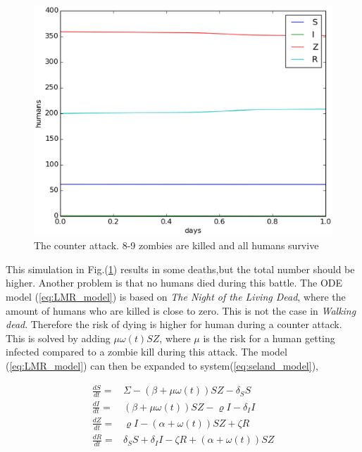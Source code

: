 \documentclass[%
twoside,                 %
final,                   %
10pt]{article}
\begin{document}
\begin{figure}[ht]
  \centerline{\includegraphics[width=0.9\linewidth]{plots/WD_zombie_counter_1.eps}}
  \caption{
  \label{fig:zombie_counter_1} The counter attack. 8-9 zombies are killed and all humans survive
  }
\end{figure}


This simulation in Fig.(\ref{fig:zombie_counter_1}) results in some deaths,but the total number should be higher. Another problem is that no humans died during this battle. The ODE model (\ref{eq:LMR_model}) is based on \emph{The Night of the Living Dead}, where the amount of humans who are killed is close to zero. This is not the case in \emph{Walking dead}. Therefore the risk of dying is higher for human during a counter attack. This is solved by adding $\mu \omega (t) SZ$, where $\mu$ is the risk for a human getting infected compared to a zombie kill during this attack. The model (\ref{eq:LMR_model}) can then be expanded to system(\ref{eq:seland_model}),

\begin{align*} \label{eq:seland_model}
\frac{dS}{dt} =& \Sigma -(\beta+\mu \omega(t))SZ - \delta_SS \\
\frac{dI}{dt} =& (\beta+\mu \omega(t))SZ - \varrho I - \delta_II\\
\frac{dZ}{dt} =& \varrho I- (\alpha+\omega(t))SZ + \zeta R\\
\frac{dR}{dt} =& \delta_SS +\delta_II -\zeta R + (\alpha+\omega(t))SZ 
\end{align*}
\end{document}
